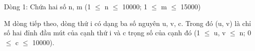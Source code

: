 Dòng 1: Chứa hai số n, m (1  $\le$  n  $\le$  10000; 1  $\le$  m  $\le$  15000)  

   M dòng tiếp theo, dòng thứ i có dạng ba số nguyên u, v, c. Trong đó (u, v) là chỉ số hai đỉnh đầu mút của cạnh thứ i và c trọng số của cạnh đó (1  $\le$  u, v  $\le$  n; 0  $\le$  c  $\le$  10000).